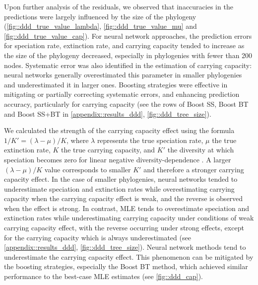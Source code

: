{Upon further analysis of the residuals, we observed that inaccuracies in the predictions were largely influenced by the size of the phylogeny (\autoref{fig::ddd_true_value_lambda}, \autoref{fig::ddd_true_value_mu} and \autoref{fig::ddd_true_value_cap}). For neural network approaches, the prediction errors for speciation rate, extinction rate, and carrying capacity tended to increase as the size of the phylogeny decreased, especially in phylogenies with fewer than 200 nodes. Systematic error was also identified in the estimation of carrying capacity: neural networks generally overestimated this parameter in smaller phylogenies and underestimated it in larger ones. Boosting strategies were effective in mitigating or partially correcting systematic errors, and enhancing prediction accuracy, particularly for carrying capacity (see the rows of Boost SS, Boost BT and Boost SS+BT in \autoref{appendix::results_ddd}, \autoref{fig::ddd_tree_size}). 

We calculated the strength of the carrying capacity effect using the formula $1/K' = (\lambda-\mu) / K$, where $\lambda$ represents the true speciation rate, $\mu$ the true extinction rate, $K$ the true carrying capacity, and $K'$ the diversity at which speciation becomes zero for linear negative diversity-dependence \citep{etienne_diversity-dependence_2012}. A larger $(\lambda-\mu) / K$ value corresponds to smaller $K'$ and therefore a stronger carrying capacity effect. In the case of smaller phylogenies, neural networks tended to underestimate speciation and extinction rates while overestimating carrying capacity when the carrying capacity effect is weak, and the reverse is observed when the effect is strong. In contrast, MLE tends to overestimate speciation and extinction rates while underestimating carrying capacity under conditions of weak carrying capacity effect, with the reverse occurring under strong effects, except for the carrying capacity which is always underestimated (see \autoref{appendix::results_ddd}, \autoref{fig::ddd_tree_size}). Neural network methods tend to underestimate the carrying capacity effect. This phenomenon can be mitigated by the boosting strategies, especially the Boost BT method, which achieved similar performance to the best-case MLE estimates (see \autoref{fig::ddd_cap}).

}
